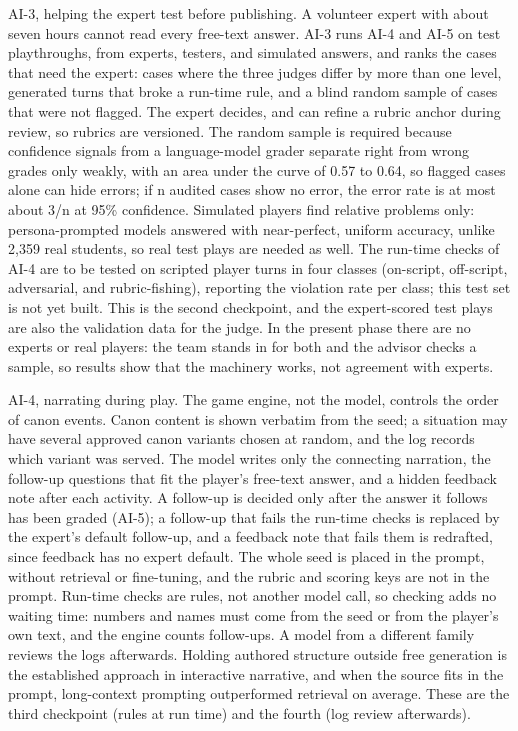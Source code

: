 AI-3, helping the expert test before publishing. A volunteer expert with about seven hours cannot read every free-text answer. AI-3 runs AI-4 and AI-5 on test playthroughs, from experts, testers, and simulated answers, and ranks the cases that need the expert: cases where the three judges differ by more than one level, generated turns that broke a run-time rule, and a blind random sample of cases that were not flagged. The expert decides, and can refine a rubric anchor during review, so rubrics are versioned. The random sample is required because confidence signals from a language-model grader separate right from wrong grades only weakly, with an area under the curve of 0.57 to 0.64\cite{r118}, so flagged cases alone can hide errors; if n audited cases show no error, the error rate is at most about 3/n at 95\% confidence\cite{r119}. Simulated players find relative problems only: persona-prompted models answered with near-perfect, uniform accuracy, unlike 2,359 real students\cite{r120}, so real test plays are needed as well. The run-time checks of AI-4 are to be tested on scripted player turns in four classes (on-script, off-script, adversarial, and rubric-fishing), reporting the violation rate per class; this test set is not yet built. This is the second checkpoint, and the expert-scored test plays are also the validation data for the judge. In the present phase there are no experts or real players: the team stands in for both and the advisor checks a sample, so results show that the machinery works, not agreement with experts.

AI-4, narrating during play. The game engine, not the model, controls the order of canon events. Canon content is shown verbatim from the seed; a situation may have several approved canon variants chosen at random, and the log records which variant was served. The model writes only the connecting narration, the follow-up questions that fit the player's free-text answer, and a hidden feedback note after each activity. A follow-up is decided only after the answer it follows has been graded (AI-5); a follow-up that fails the run-time checks is replaced by the expert's default follow-up, and a feedback note that fails them is redrafted, since feedback has no expert default. The whole seed is placed in the prompt, without retrieval or fine-tuning, and the rubric and scoring keys are not in the prompt. Run-time checks are rules, not another model call, so checking adds no waiting time: numbers and names must come from the seed or from the player's own text, and the engine counts follow-ups. A model from a different family reviews the logs afterwards. Holding authored structure outside free generation is the established approach in interactive narrative\cite{r121}, and when the source fits in the prompt, long-context prompting outperformed retrieval on average\cite{r122}. These are the third checkpoint (rules at run time) and the fourth (log review afterwards).

